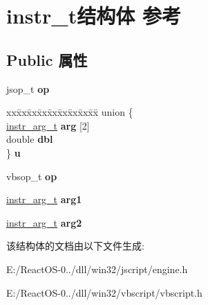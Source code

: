 \hypertarget{structinstr__t}{}\section{instr\+\_\+t结构体 参考}
\label{structinstr__t}
\subsection*{Public 属性}
\begin{DoxyCompactItemize}
\item 
\mbox{\label{structinstr__t_a9b5c516348ecebb3fee42e1d090aaf98}} 
jsop\+\_\+t {\bfseries op}
\item 
\mbox{\label{structinstr__t_a81aab310faa36af99e572377d9c03643}} 
\begin{tabbing}
xx\=xx\=xx\=xx\=xx\=xx\=xx\=xx\=xx\=\kill
union \{\\
\>\hyperlink{unioninstr__arg__t}{instr\_arg\_t} {\bfseries arg} \mbox{[}2\mbox{]}\\
\>double {\bfseries dbl}\\
\} {\bfseries u}\\

\end{tabbing}\item 
\mbox{\label{structinstr__t_a3aff79ef40155ab989c93fac9b6f0c78}} 
vbsop\+\_\+t {\bfseries op}
\item 
\mbox{\label{structinstr__t_a59e0006f1126887659a221e785595311}} 
\hyperlink{unioninstr__arg__t}{instr\+\_\+arg\+\_\+t} {\bfseries arg1}
\item 
\mbox{\label{structinstr__t_a3114f114a2f7f315f50848f7ac59dc79}} 
\hyperlink{unioninstr__arg__t}{instr\+\_\+arg\+\_\+t} {\bfseries arg2}
\end{DoxyCompactItemize}


该结构体的文档由以下文件生成\+:\begin{DoxyCompactItemize}
\item 
E\+:/\+React\+O\+S-\/0../dll/win32/jscript/engine.\+h\item 
E\+:/\+React\+O\+S-\/0../dll/win32/vbscript/vbscript.\+h\end{DoxyCompactItemize}
